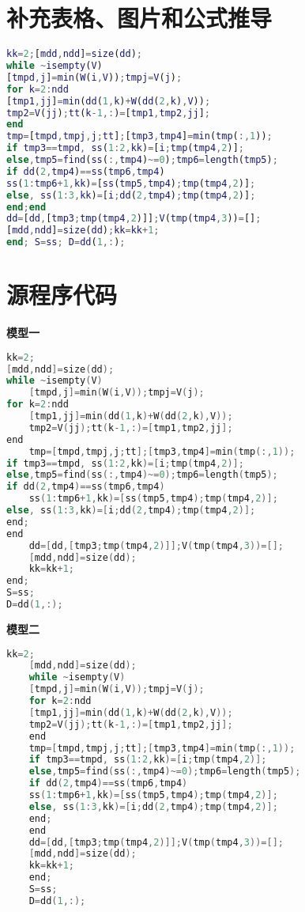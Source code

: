 \documentclass[withoutpreface,bwprint]{cumcmthesis} %
\begin{document}
\begin{appendices}
\section{补充表格、图片和公式推导}

\begin{lstlisting}[language=matlab]
kk=2;[mdd,ndd]=size(dd);
while ~isempty(V)
[tmpd,j]=min(W(i,V));tmpj=V(j);
for k=2:ndd
[tmp1,jj]=min(dd(1,k)+W(dd(2,k),V));
tmp2=V(jj);tt(k-1,:)=[tmp1,tmp2,jj];
end
tmp=[tmpd,tmpj,j;tt];[tmp3,tmp4]=min(tmp(:,1));
if tmp3==tmpd, ss(1:2,kk)=[i;tmp(tmp4,2)];
else,tmp5=find(ss(:,tmp4)~=0);tmp6=length(tmp5);
if dd(2,tmp4)==ss(tmp6,tmp4)
ss(1:tmp6+1,kk)=[ss(tmp5,tmp4);tmp(tmp4,2)];
else, ss(1:3,kk)=[i;dd(2,tmp4);tmp(tmp4,2)];
end;end
dd=[dd,[tmp3;tmp(tmp4,2)]];V(tmp(tmp4,3))=[];
[mdd,ndd]=size(dd);kk=kk+1;
end; S=ss; D=dd(1,:);
 \end{lstlisting}












 \section{源程序代码}



\textbf{模型一}


\begin{lstlisting}[language=c]
kk=2;
[mdd,ndd]=size(dd);
while ~isempty(V)
    [tmpd,j]=min(W(i,V));tmpj=V(j);
for k=2:ndd
    [tmp1,jj]=min(dd(1,k)+W(dd(2,k),V));
    tmp2=V(jj);tt(k-1,:)=[tmp1,tmp2,jj];
end
    tmp=[tmpd,tmpj,j;tt];[tmp3,tmp4]=min(tmp(:,1));
if tmp3==tmpd, ss(1:2,kk)=[i;tmp(tmp4,2)];
else,tmp5=find(ss(:,tmp4)~=0);tmp6=length(tmp5);
if dd(2,tmp4)==ss(tmp6,tmp4)
    ss(1:tmp6+1,kk)=[ss(tmp5,tmp4);tmp(tmp4,2)];
else, ss(1:3,kk)=[i;dd(2,tmp4);tmp(tmp4,2)];
end;
end
    dd=[dd,[tmp3;tmp(tmp4,2)]];V(tmp(tmp4,3))=[];
    [mdd,ndd]=size(dd);
    kk=kk+1;
end;
S=ss;
D=dd(1,:);
 \end{lstlisting}


\textbf{模型二}

\begin{lstlisting}[language=c]
	kk=2;
	[mdd,ndd]=size(dd);
	while ~isempty(V)
	[tmpd,j]=min(W(i,V));tmpj=V(j);
	for k=2:ndd
	[tmp1,jj]=min(dd(1,k)+W(dd(2,k),V));
	tmp2=V(jj);tt(k-1,:)=[tmp1,tmp2,jj];
	end
	tmp=[tmpd,tmpj,j;tt];[tmp3,tmp4]=min(tmp(:,1));
	if tmp3==tmpd, ss(1:2,kk)=[i;tmp(tmp4,2)];
	else,tmp5=find(ss(:,tmp4)~=0);tmp6=length(tmp5);
	if dd(2,tmp4)==ss(tmp6,tmp4)
	ss(1:tmp6+1,kk)=[ss(tmp5,tmp4);tmp(tmp4,2)];
	else, ss(1:3,kk)=[i;dd(2,tmp4);tmp(tmp4,2)];
	end;
	end
	dd=[dd,[tmp3;tmp(tmp4,2)]];V(tmp(tmp4,3))=[];
	[mdd,ndd]=size(dd);
	kk=kk+1;
	end;
	S=ss;
	D=dd(1,:);
\end{lstlisting}



\end{appendices}
\end{document}
